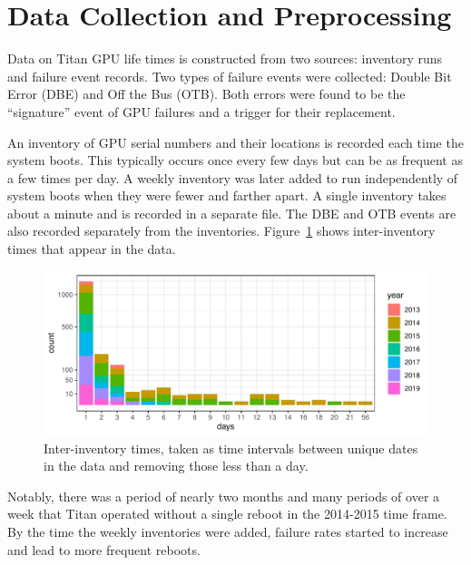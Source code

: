 \section{Data Collection and Preprocessing}
\label{section:dataprep}
Data on Titan GPU life times is constructed from two sources:
inventory runs and failure event records. Two types of failure events
were collected: Double Bit Error (DBE) and Off the Bus (OTB). Both
errors were found to be the ``signature'' event of GPU failures and a
trigger for their replacement.

An inventory of GPU serial numbers and their locations is recorded
each time the system boots. This typically occurs once every few days
but can be as frequent as a few times per day. A weekly inventory was
later added to run independently of system boots when they were fewer
and farther apart. A single inventory takes about a minute and is
recorded in a separate file. The DBE and OTB events are also recorded
separately from the inventories.  Figure~\ref{fig:inventory} shows
inter-inventory times that appear in the data.
\begin{figure}[bt]
  \begin{center}
    \includegraphics[width=\columnwidth]{figs/attention_intervals001.pdf}
  \end{center}
  \caption{Inter-inventory times, taken as time intervals between
    unique dates in the data and removing those less than a day.}
  \label{fig:inventory}
\end{figure}
Notably, there was a period of nearly two months and many periods of over a
week that Titan operated without a single reboot in the
2014-2015 time frame. By the time the weekly inventories were added,
failure rates started to increase and lead to more frequent reboots.

